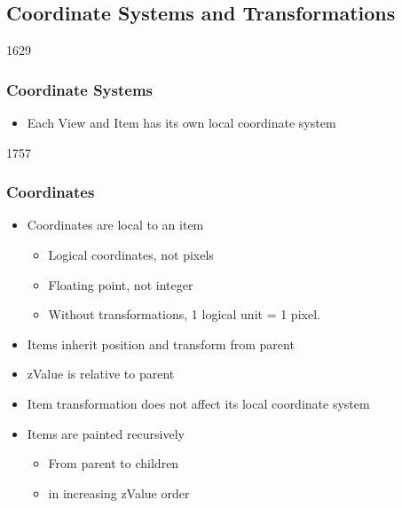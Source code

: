 %
%
%
%


\subsection{Coordinate Systems and Transformations}


\begin{slide}{1629}\frametitle{Coordinate Systems}

\begin{itemize}
\item Each View and Item has its own local coordinate system
\end{itemize}
\end{slide}



\begin{slide}{1757}

\frametitle{Coordinates}
\begin{itemize}
\item Coordinates are local to an item
    \begin{itemize}
    \item Logical coordinates, not pixels
    \item Floating point, not integer
    \item Without transformations, 1 logical unit = 1 pixel.
    \end{itemize}   
\item Items inherit position and transform from parent
\item zValue is relative to parent
\item Item transformation does not affect its local coordinate system
\item Items are painted recursively
    \begin{itemize}
    \item From parent to children
    \item in increasing zValue order
    \end{itemize}
\end{itemize}
\end{slide}


